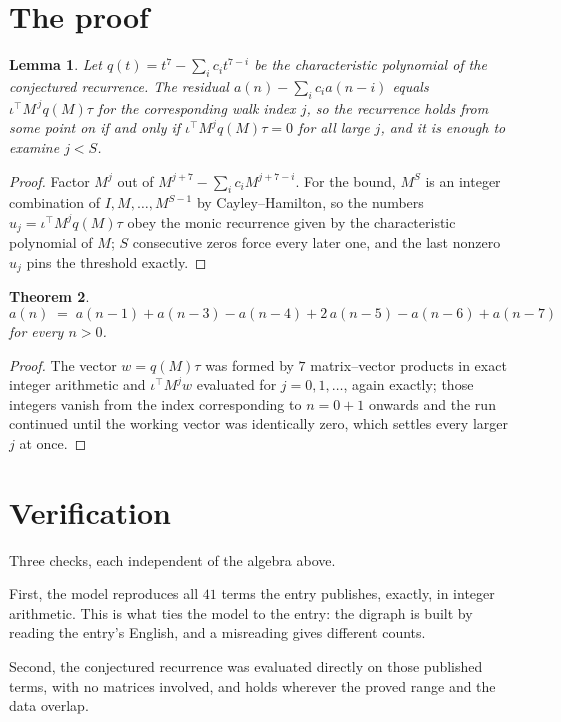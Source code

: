 \documentclass[11pt,a4paper]{article}
\theoremstyle{plain}
\newtheorem{theorem}{Theorem}
\newtheorem{lemma}[theorem]{Lemma}
\theoremstyle{definition}
\begin{document}
\section{The proof}

\begin{lemma}\label{lem:crit}
Let $q(t)=t^{7}-\sum_i c_it^{7-i}$ be the characteristic polynomial of the
conjectured recurrence. The residual $a(n)-\sum_ic_ia(n-i)$ equals
$\iota^{\!\top}M^{\,j}q(M)\tau$ for the corresponding walk index $j$, so the recurrence
holds from some point on if and only if $\iota^{\!\top}M^{j}q(M)\tau=0$ for all large $j$,
and it is enough to examine $j<S$.
\end{lemma}

\begin{proof}
Factor $M^{j}$ out of $M^{j+7}-\sum_ic_iM^{j+7-i}$. For the bound, $M^{S}$
is an integer combination of $I,M,\dots,M^{S-1}$ by Cayley--Hamilton, so the numbers
$u_j=\iota^{\!\top}M^{j}q(M)\tau$ obey the monic recurrence given by the characteristic
polynomial of $M$; $S$ consecutive zeros force every later one, and the last nonzero $u_j$
pins the threshold exactly.
\end{proof}

\begin{theorem}
\[
a(n)\;=\;a(n-1) + a(n-3) - a(n-4) + 2\,a(n-5) - a(n-6) + a(n-7)
\]
for every $n>0$.
\end{theorem}

\begin{proof}
The vector $w=q(M)\tau$ was formed by $7$ matrix--vector products in exact integer
arithmetic and $\iota^{\!\top}M^{j}w$ evaluated for $j=0,1,\dots$, again exactly; those
integers vanish from the index corresponding to $n=0+1$ onwards and the run continued
until the working vector was identically zero, which settles every larger $j$ at once.
\end{proof}

\section{Verification}

Three checks, each independent of the algebra above.

First, the model reproduces all $41$ terms the entry publishes, exactly, in integer
arithmetic. This is what ties the model to the entry: the digraph is built by reading the
entry's English, and a misreading gives different counts.

Second, the conjectured recurrence was evaluated directly on those published terms, with no
matrices involved, and holds wherever the proved range and the data overlap.
\end{document}
